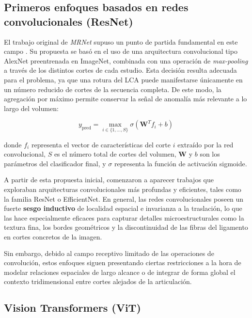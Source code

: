 \subsection{Primeros enfoques basados en redes convolucionales (ResNet)}

El trabajo original de \textit{MRNet} supuso un punto de partida fundamental en este campo \cite{bien2018deep}. Su propuesta se basó en el uso de una arquitectura convolucional tipo AlexNet preentrenada en ImageNet, combinada con una operación de \textit{max-pooling} a través de los distintos cortes de cada estudio. Esta decisión resulta adecuada para el problema, ya que una rotura del LCA puede manifestarse únicamente en un número reducido de cortes de la secuencia completa. De este modo, la agregación por máximo permite conservar la señal de anomalía más relevante a lo largo del volumen:

\begin{equation}
y_{\text{pred}} = \max_{i \in \{1, \dots, S\}} \sigma(\mathbf{W}^T f_i + b)
\end{equation}

\noindent donde $f_i$ representa el vector de características del corte $i$ extraído por la red convolucional, $S$ es el número total de cortes del volumen, $\mathbf{W}$ y $b$ son los parámetros del clasificador final, y $\sigma$ representa la función de activación sigmoide.

A partir de esta propuesta inicial, comenzaron a aparecer trabajos que exploraban arquitecturas convolucionales más profundas y eficientes, tales como la familia ResNet \cite{he2016deep} o EfficientNet. En general, las redes convolucionales poseen un fuerte \textbf{sesgo inductivo} de localidad espacial e invarianza a la traslación, lo que las hace especialmente eficaces para capturar detalles microestructurales como la textura fina, los bordes geométricos y la discontinuidad de las fibras del ligamento en cortes concretos de la imagen.

Sin embargo, debido al campo receptivo limitado de las operaciones de convolución, estos enfoques siguen presentando ciertas restricciones a la hora de modelar relaciones espaciales de largo alcance o de integrar de forma global el contexto tridimensional entre cortes alejados de la articulación.

\subsection{Vision Transformers (ViT)}

